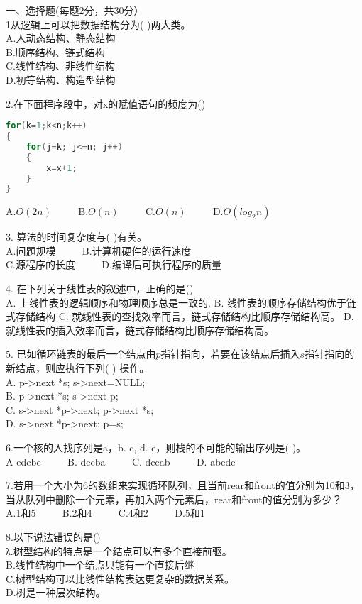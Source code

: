 

一、选择题(每题2分，共30分） \\
1从逻辑上可以把数据结构分为( )两大类。 \\
A.人动态结构、静态结构 \\
B.顺序结构、链式结构 \\
C.线性结构、非线性结构 \\
D.初等结构、构造型结构

2.在下面程序段中，对x的赋值语句的频度为() \\
\begin{lstlisting}[language=cpp]
for(k=1;k<n;k++)
{
    for(j=k; j<=n; j++)
    {
        x=x+1;
    }
}
\end{lstlisting}
A.$O(2n)$ $\qquad$ B.$O(n)$ $\qquad$ C.$O(n)$ $\qquad$ D.$O(log_2n)$

3. 算法的时间复杂度与(    )有关。 \\
A.问题规模 $\qquad$  B.计算机硬件的运行速度 \\
C.源程序的长度 $\qquad$ D.编译后可执行程序的质量

4. 在下列关于线性表的叙述中，正确的是() \\
A. 上线性表的逻辑顺序和物理顺序总是一致的.
B. 线性表的顺序存储结构优于链式存储结构
C. 就线性表的查找效率而言，链式存储结构比顺序存储结构高。
D. 就线性表的插入效率而言，链式存储结构比顺序存储结构高。

5. 已如循环链表的最后一个结点由$p$指针指向，若要在该结点后插入$s$指针指向的新结点，则应执行下列( ) 操作。 \\
A. p->next *s; s->next=NULL; \\
B. p->next *s; s->next-p;  \\
C. s->next *p->next; p->next *s;  \\
D. s->next *p->next; p=s;

6.一个核的入找序列是a，b. c, d. e，则栈的不可能的输出序列是(  )。 \\
A edcbe  $\qquad$  B. decba  $\qquad$  C. dceab  $\qquad$ D. abede

7.若用一个大小为6的数组来实现循环队列，且当前rear和front的值分别为10和3，当从队列中删除一个元素，再加入两个元素后，rear和front的值分别为多少？  \\
A.1和5  $\qquad$  B.2和4  $\qquad$  C.4和2  $\qquad$  D.5和1

8.以下说法错误的是()  \\
λ.树型结构的特点是一个结点可以有多个直接前驱。 \\
B.线性结构中一个结点只能有一个直接后继 \\
C.树型结构可以比线性结构表达更复杂的数据关系。 \\
D.树是一种层次结构。

